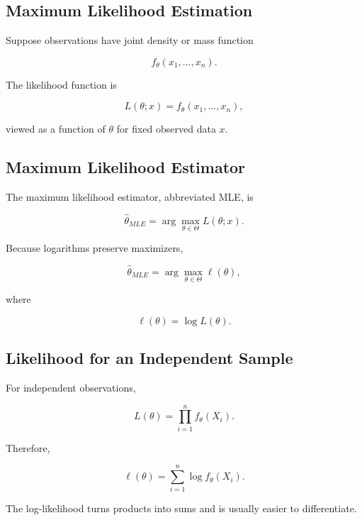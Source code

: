 \subsection{Maximum Likelihood Estimation}
\label{subsec:maximum-likelihood-estimation-mathstat}

Suppose observations have joint density or mass function

\[
f_\theta(x_1,\ldots,x_n).
\]

The likelihood function is

\[
\boxed{
L(\theta;x)
=
f_\theta(x_1,\ldots,x_n),
}
\]

viewed as a function of \(\theta\) for fixed observed data \(x\).

\subsection{Maximum Likelihood Estimator}
\label{subsec:maximum-likelihood-estimator}

The maximum likelihood estimator, abbreviated MLE, is

\[
\boxed{
\widehat{\theta}_{MLE}
=
\arg\max_{\theta\in\Theta}
L(\theta;x).
}
\]

Because logarithms preserve maximizers,

\[
\boxed{
\widehat{\theta}_{MLE}
=
\arg\max_{\theta\in\Theta}
\ell(\theta),
}
\]

where

\[
\ell(\theta)
=
\log L(\theta).
\]

\subsection{Likelihood for an Independent Sample}
\label{subsec:likelihood-independent-sample}

For independent observations,

\[
\boxed{
L(\theta)
=
\prod_{i=1}^{n}
f_\theta(X_i).
}
\]

Therefore,

\[
\boxed{
\ell(\theta)
=
\sum_{i=1}^{n}
\log f_\theta(X_i).
}
\]

The log-likelihood turns products into sums and is usually easier to
differentiate.

